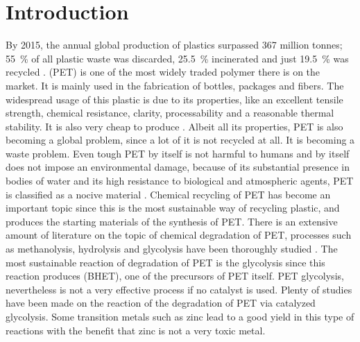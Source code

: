 \section{Introduction}

By 2015, the annual global production of plastics surpassed 367 million tonnes; \SI{55}{\percent} of all plastic waste was discarded, \SI{25.5}{\percent} incinerated and just \SI{19.5}{\percent} was recycled \cite{Geyer2017}.  (PET) is one of the most widely traded polymer there is on the market. It is mainly used in the fabrication of bottles, packages and fibers. The widespread usage of this plastic is due to its properties, like an excellent tensile strength, chemical resistance, clarity, processability and a reasonable thermal stability. It is also very cheap to produce \cite{Caldicott1999,Thompson2009}. Albeit all its properties, PET is also becoming a global problem, since a lot of it is not recycled at all. It is becoming a waste problem. Even tough PET by itself is not harmful to humans and by itself does not impose an environmental damage, because of its substantial presence in bodies of water and its high resistance to biological and atmospheric agents, PET is classified as a nocive material \cite{Paszun1997}.
Chemical recycling of PET has become an important topic since this is the most sustainable way of recycling plastic, and produces  the starting materials of the synthesis of PET. There is an extensive amount of literature on the topic of chemical degradation of PET, processes such as methanolysis, hydrolysis and glycolysis have been thoroughly  studied \cite{Campanelli1993,Campanelli1994,Campanelli1994a}. The most sustainable reaction of degradation of PET is the glycolysis since this reaction produces  (BHET), one of the precursors of PET itself. PET glycolysis, nevertheless is not a very effective process if no catalyst is used. Plenty of studies have been made on the reaction of the degradation of PET via catalyzed glycolysis. Some transition metals such as zinc lead to a good yield in this type of reactions with the benefit that zinc is not a very toxic metal.
